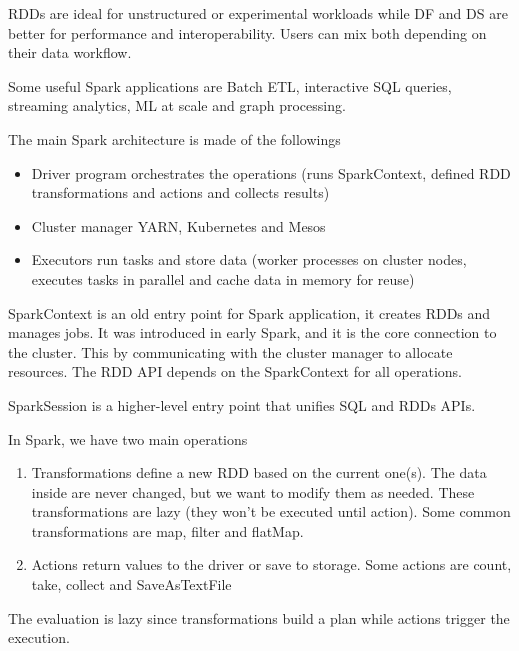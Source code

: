 RDDs are ideal for unstructured or experimental workloads while DF and DS are better for performance and interoperability. Users can mix both depending on their data workflow. 

Some useful Spark applications are Batch ETL, interactive SQL queries, streaming analytics, ML at scale and graph processing.

\vspace{10pt}

The main Spark architecture is made of the followings
\begin{itemize}
    \item Driver program \ra orchestrates the operations (runs SparkContext, defined RDD transformations and actions and collects results)
    \item Cluster manager \ra YARN, Kubernetes and Mesos
    \item Executors \ra run tasks and store data (worker processes on cluster nodes, executes tasks in parallel and cache data in memory for reuse)
\end{itemize}

SparkContext is an old entry point for Spark application, it creates RDDs and manages jobs. It was introduced in early Spark, and it is the core connection to the cluster. This by communicating with the cluster manager to allocate resources. The RDD API depends on the SparkContext for all operations.

\vspace{10pt}

SparkSession is a higher-level entry point that unifies SQL and RDDs APIs.

\vspace{10pt}

In Spark, we have two main operations
\begin{enumerate}
    \item Transformations \ra define a new RDD based on the current one(s). The data inside are never changed, but we want to modify them as needed. These transformations are lazy (they won't be executed until action). Some common transformations are map, filter and flatMap.
    \item Actions \ra return values to the driver or save to storage. Some actions are count, take, collect and SaveAsTextFile
\end{enumerate}

The evaluation is lazy since transformations build a plan while actions trigger the execution.

